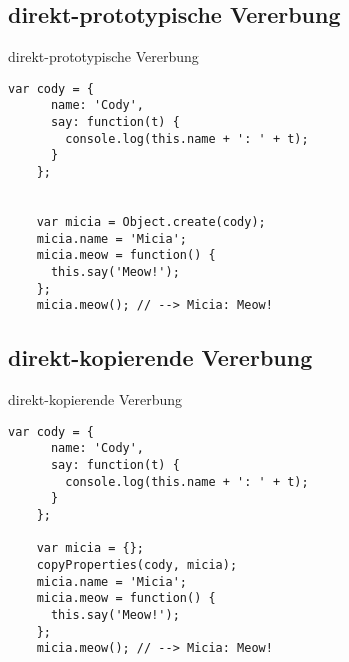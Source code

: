 
\subsection{direkt-prototypische Vererbung}

\begin{frame}[fragile]{direkt-prototypische Vererbung}
  \begin{lstlisting}[gobble=4]
    var cody = {
      name: 'Cody',
      say: function(t) {
        console.log(this.name + ': ' + t);
      }
    };
    
    
    var micia = Object.create(cody);
    micia.name = 'Micia';
    micia.meow = function() {
      this.say('Meow!');
    };
    micia.meow(); // --> Micia: Meow!
  \end{lstlisting}
\end{frame}

\subsection{direkt-kopierende Vererbung}

\begin{frame}[fragile]{direkt-kopierende Vererbung}
  \begin{lstlisting}[gobble=4]
    var cody = {
      name: 'Cody',
      say: function(t) {
        console.log(this.name + ': ' + t);
      }
    };
      
    var micia = {};
    copyProperties(cody, micia);
    micia.name = 'Micia';
    micia.meow = function() {
      this.say('Meow!');
    };
    micia.meow(); // --> Micia: Meow!
  \end{lstlisting}
\end{frame}

